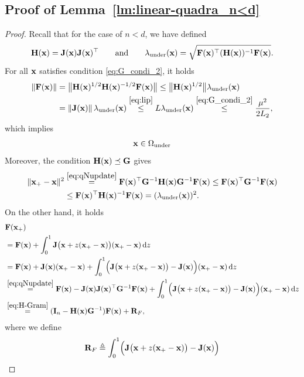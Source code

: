 \documentclass[11pt]{article}
\theoremstyle{plain}
\theoremstyle{definition}
\theoremstyle{remark}
\theoremstyle{plain}
\newcommand{\Norm}[1]{\left\| #1 \right\|}
\def\vx{{\bf{x}}}
\newcommand{\R}{\mathbb{R}}
\def\vx {{{\bf x}}}
\def\F{{\bf F}}
\def\G{{\bf G}}
\def\H{{\bf H}}
\def\I{{\bf I}}
\def \J{{\bf J}}
\def\R{{\bf R}}
\def\x{{\bf x}}
\begin{document}
\subsection{Proof of Lemma~\ref{lm:linear-quadra_n<d}}
\label{app:proof_lemma_linear_quadratic_under}
\begin{proof}
Recall that for the case of $n<d$,
we have defined   
\begin{align*}
\H(\x)=\J(\x)\J(\x)^{\top}
\qquad\text{and}\qquad
\lambda_{\mathrm{under}}(\x) =\sqrt{\F(\x)^{\top}(\H(\x))^{-1}\F(\x)}.
\end{align*}
For all $\vx$ satisfies condition \eqref{eq:G_condi_2},
it holds
\begin{align*}
\|\F(\x)\|
&=\big\|\H(\x)^{1/2}\H(\x)^{-1/2}\F(\x)\big\|
\leq\big\|\H(\x)^{1/2}\big\|\lambda_{\mathrm{under}}(\x)
\\&=\Norm{\J(\x)}\lambda_{\mathrm{under}}(\x)\overset{\eqref{eq:lip}}{\leq}L\lambda_{\mathrm{under}}(\x)
\overset{\eqref{eq:G_condi_2}}{\leq}\frac{\mu^2}{2L_2},
\end{align*}
which implies 
\begin{align}\label{eq:x-in-under}
 \x\in\Omega_{\mathrm{under}}   
\end{align}
Moreover, the condition $\H(\x)\preceq\G$  gives
\begin{align}
\label{eq:boundr_lambda}
\|\x_{+}-\x\|^2
&\overset{\eqref{eq:qNupdate}}{=}
\F(\x)^{\top}\G^{-1}\H(\x)\G^{-1}\F(\x)\notag\leq\F(\x)^{\top}\G^{-1}\F(\x)\\
&\leq\F(\x)^{\top}\H(\x)^{-1}\F(\x)
 =(\lambda_{\mathrm{under}}(\x))^2.
\end{align}
On the other hand, it holds
\begin{align}
\label{eq:Fx_+Fx}
\begin{split}
&\F(\x_{+})\\
&=\F(\x)+\int_0^1
\J\bigl(\x+z(\x_{+}-\x)\bigr)(\x_{+}-\x)\,{\rm d}z\\
&=\F(\x)+\J(\x)(\x_{+}-\x)+\int_0^1\Bigl(\J\bigl(\x+z(\x_{+}-\x)\bigr)-\J(\x)\Bigr)
(\x_{+}-\x)\,{\rm d}z\\
&\overset{\eqref{eq:qNupdate}}{=}
\F(\x)-\J(\x)\J(\x)^{\top}\G^{-1}\F(\x)+\int_0^1\Bigl(\J\bigl(\x+z(\x_{+}-\x)\bigr)-\J(\x)\Bigr)
(\x_{+}-\x)\,{\rm d}z\\
&\overset{\eqref{eq:H-Gram}}{=}
(\I_n-\H(\x)\G^{-1})\F(\x)+\R_F,
\end{split}
\end{align}
where we define
\begin{align*}
\R_F
\triangleq\int_0^1\Bigl(\J\bigl(\x+z(\x_{+}-\x)\bigr)-\J(\x)\Bigr)

\end{align*}
\end{proof}
\end{document}
